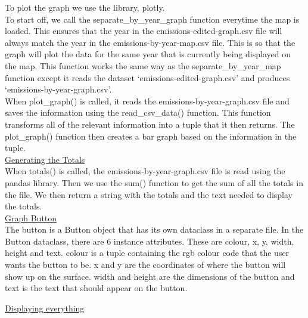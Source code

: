 \documentclass[fontsize=11pt]{article}
\begin{document}
To plot the graph we use the library, plotly. \\
To start off, we call the separate\_by\_year\_graph function everytime the map is loaded. This ensures that the year in the emissions-edited-graph.csv file will always match the year in the emissions-by-year-map.csv file. This is so that the graph will plot the data for the same year that is currently being displayed on the map. This function works the same way as the separate\_by\_year\_map function except it reads the dataset ‘emissions-edited-graph.csv’ and produces ‘emissions-by-year-graph.csv’. \\
When plot\_graph() is called, it reads the emissions-by-year-graph.csv file and saves the information using the read\_csv\_data() function. This function transforms all of the relevant information into a tuple that it then returns. The plot\_graph() function then creates a bar graph based on the information in the tuple. \\

\underline{Generating the Totals} \\

When totals() is called, the emissions-by-year-graph.csv file is read using the pandas library. Then we use the sum() function to get the sum of all the totals in the file. We then return a string with the totals and the text needed to display the totals.  \\

\underline{Graph Button} \\

The button is a Button object that has its own dataclass in a separate file. In the Button dataclass, there are 6 instance attributes. These are colour, x, y, width, height and text. colour is a tuple containing the rgb colour code that the user wants the button to be. x and y are the coordinates of where the button will show up on the surface. width and height are the dimensions of the button and text is the text that should appear on the button.

\underline{Displaying everything}  \\
\end{document}
